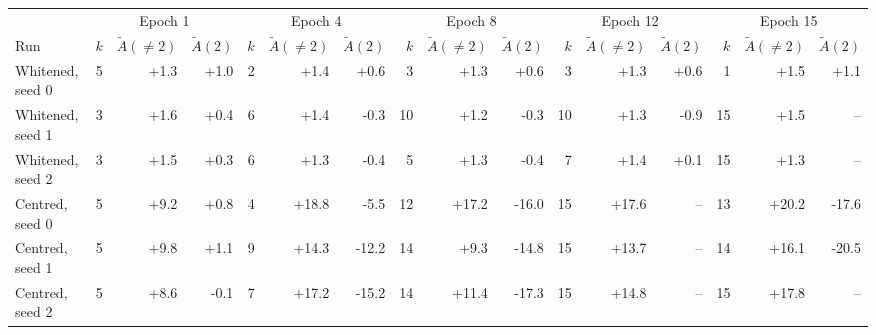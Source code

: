 \begin{tabular}{lrrrrrrrrrrrrrrr}
\toprule
 & \multicolumn{3}{c}{Epoch 1} & \multicolumn{3}{c}{Epoch 4} & \multicolumn{3}{c}{Epoch 8} & \multicolumn{3}{c}{Epoch 12} & \multicolumn{3}{c}{Epoch 15} \\
\cmidrule(lr){2-4} \cmidrule(lr){5-7} \cmidrule(lr){8-10} \cmidrule(lr){11-13} \cmidrule(lr){14-16}
Run & $k$ & $\tilde A(\ne 2)$ & $\tilde A(2)$ & $k$ & $\tilde A(\ne 2)$ & $\tilde A(2)$ & $k$ & $\tilde A(\ne 2)$ & $\tilde A(2)$ & $k$ & $\tilde A(\ne 2)$ & $\tilde A(2)$ & $k$ & $\tilde A(\ne 2)$ & $\tilde A(2)$ \\
\midrule
Whitened, seed 0 & 5 & +1.3 & +1.0 & 2 & +1.4 & +0.6 & 3 & +1.3 & +0.6 & 3 & +1.3 & +0.6 & 1 & +1.5 & +1.1 \\
Whitened, seed 1 & 3 & +1.6 & +0.4 & 6 & +1.4 & -0.3 & 10 & +1.2 & -0.3 & 10 & +1.3 & -0.9 & 15 & +1.5 & -- \\
Whitened, seed 2 & 3 & +1.5 & +0.3 & 6 & +1.3 & -0.4 & 5 & +1.3 & -0.4 & 7 & +1.4 & +0.1 & 15 & +1.3 & -- \\
Centred, seed 0 & 5 & +9.2 & +0.8 & 4 & +18.8 & -5.5 & 12 & +17.2 & -16.0 & 15 & +17.6 & -- & 13 & +20.2 & -17.6 \\
Centred, seed 1 & 5 & +9.8 & +1.1 & 9 & +14.3 & -12.2 & 14 & +9.3 & -14.8 & 15 & +13.7 & -- & 14 & +16.1 & -20.5 \\
Centred, seed 2 & 5 & +8.6 & -0.1 & 7 & +17.2 & -15.2 & 14 & +11.4 & -17.3 & 15 & +14.8 & -- & 15 & +17.8 & -- \\
\bottomrule
\end{tabular}
